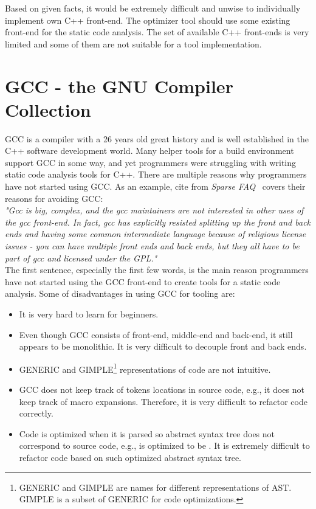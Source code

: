 Based on given facts, it would be extremely difficult and unwise to individually implement own C++ front-end. The optimizer tool should use some existing front-end for the static code analysis. The set of available C++ front-ends is very limited and some of them are not suitable for a tool implementation.

\section{GCC - the GNU Compiler Collection}
GCC is a compiler with a 26 years old great history and is well established in the C++ software development world. Many helper tools for a build environment support GCC in some way, and yet programmers were struggling with writing static code analysis tools for C++. There are multiple reasons why programmers have not started using GCC. As an example, cite from \emph{Sparse FAQ}~\cite{sparse} covers their reasons for avoiding GCC: \\

\textit{"Gcc is big, complex, and the gcc maintainers are not interested in other uses of the gcc front-end.  In fact, gcc has explicitly resisted splitting up the front and back ends and having some common intermediate language because of religious license issues - you can have multiple front ends and back ends, but they all have to be part of gcc and licensed under the GPL."}\\

The first sentence, especially the first few words, is the main reason programmers have not started using the GCC front-end to create tools for a static code analysis. Some of disadvantages in using GCC for tooling are:

\begin{itemize}
\item It is very hard to learn for beginners.

\item Even though GCC consists of front-end, middle-end and back-end, it still appears to be monolithic. It is very difficult to decouple front and back ends.

\item GENERIC and GIMPLE\footnote{GENERIC and GIMPLE are names for different representations of AST. GIMPLE is a subset of GENERIC for code optimizations.} representations of code are not intuitive.

\item GCC does not keep track of tokens locations in source code, e.g., it does not keep track of macro expansions. Therefore, it is very difficult to refactor code correctly.

\item Code is optimized when it is parsed so abstract syntax tree does not correspond to source code, e.g.,  is optimized to be . It is extremely difficult to refactor code based on such optimized abstract syntax tree.
\end{itemize}

